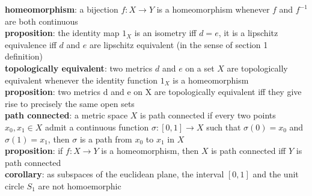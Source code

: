 \documentclass[a4paper]{article}
\begin{document}
\begin{framed}
	\noindent
	\textbf{homeomorphism}: a bijection $f: X \rightarrow Y$ is a homeomorphism whenever $f$ and $f^{-1}$ are both continuous\\
	
	\noindent
	\textbf{proposition}: the identity map $1_X$ is an isometry iff $d = e$, it is a lipschitz equivalence iff $d$ and $e$ are lipschitz equivalent (in the sense of section 1 definition)\\
	
	\noindent
	\textbf{topologically equivalent}: two metrics $d$ and $e$ on a set $X$ are topologically equivalent whenever the identity function $1_X$ is a homeomorphism\\
	
	\noindent
	\textbf{proposition}: two metrics d and e on X are topologically equivalent iff they give rise to precisely the same open sets\\
	
	\noindent
	\textbf{path connected}: a metric space $X$ is path connected if every two points $x_0, x_1 \in X$ admit a continuous function $\sigma: [0, 1] \rightarrow X$ such that $\sigma(0) = x_0$ and $\sigma(1) = x_1$, then $\sigma$ is a path from $x_0$ to $x_1$ in $X$\\
	
	\noindent
	\textbf{proposition}: if $f: X \rightarrow Y$ is a homeomorphism, then $X$ is path connected iff $Y$ is path connected\\
	
	\noindent
	\textbf{corollary}: as subspaces of the euclidean plane, the interval $[0, 1]$ and the unit circle $S_1$ are not homoemorphic
\end{framed}
\end{document}

